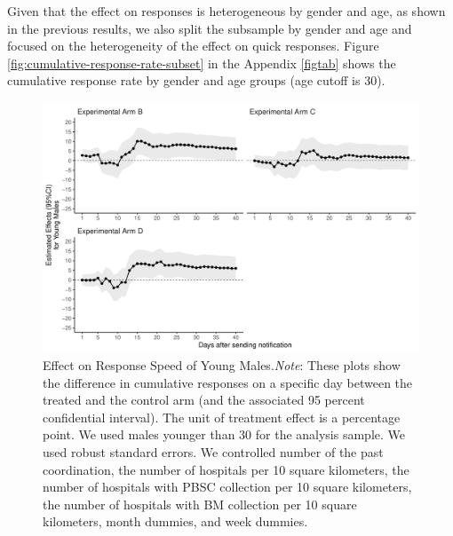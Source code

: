 \documentclass[12pt, a4paper]{article}
\begin{document}
Given that the effect on responses is heterogeneous by gender and age, as shown in the previous results, we also split the subsample by gender and age and focused on the heterogeneity of the effect on quick responses. Figure \ref{fig:cumulative-response-rate-subset} in the Appendix \ref{figtab} shows the cumulative response rate by gender and age groups (age cutoff is 30).

\begin{figure}[t]
\includegraphics{JMDP RCT - Main Document_files/figure-latex/young-male-flow-1} \caption{Effect on Response Speed of Young Males.\newline \emph{Note}: These plots show the difference in cumulative responses on a specific day between the treated and the control arm (and the associated 95 percent confidential interval). The unit of treatment effect is a percentage point. We used males younger than 30 for the analysis sample. We used robust standard errors. We controlled number of the past coordination, the number of hospitals per 10 square kilometers, the number of hospitals with PBSC collection per 10 square kilometers, the number of hospitals with BM collection per 10 square kilometers, month dummies, and week dummies.}\label{fig:young-male-flow}
\end{figure}
\end{document}
